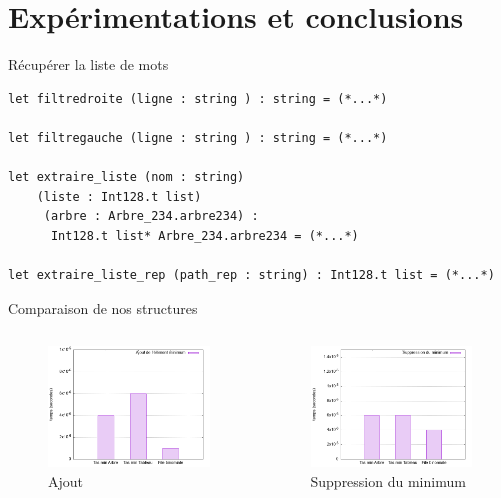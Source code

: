 \documentclass[11pt]{beamer}
\begin{document}
\section{Expérimentations et conclusions}


\begin{frame}[fragile]{Récupérer la liste de mots}

\begin{lstlisting}
let filtredroite (ligne : string ) : string = (*...*)

let filtregauche (ligne : string ) : string = (*...*)

let extraire_liste (nom : string) 
	(liste : Int128.t list)
	 (arbre : Arbre_234.arbre234) :
	  Int128.t list* Arbre_234.arbre234 = (*...*)

let extraire_liste_rep (path_rep : string) : Int128.t list = (*...*)
\end{lstlisting}


\end{frame}




\begin{frame}{Comparaison de nos structures}

\begin{columns}[t]
  \begin{column}{5cm}
  
\begin{figure}[hbtp]
\centering
\includegraphics[width=5cm]{../Images/svg courbes pour rapport/temps_ajout_shakespeare.png} 
\caption{Ajout}
\label{fig1}
\end{figure}


  \end{column}
 
  \begin{column}{5cm}

\begin{figure}[hbtp]
\centering
\includegraphics[width=5cm]{../Images/svg courbes pour rapport/temps_suppr_shakespeare.png} 
\caption{Suppression du minimum}
\label{fig1}
\end{figure}

  \end{column}
 \end{columns}  

\end{frame}
\end{document}
